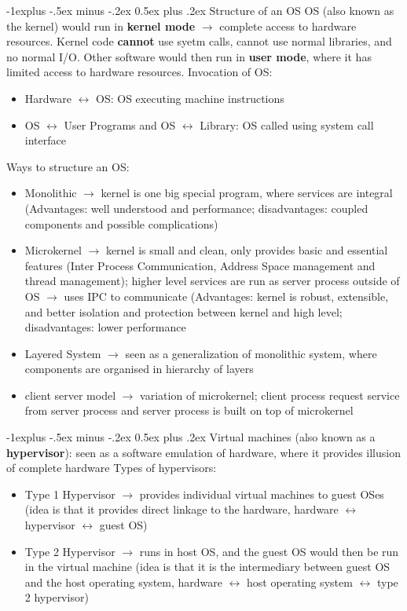\documentclass[a4paper,10pt,landscape]{article}
\makeatletter
\renewcommand{\subsection}{\@startsection{subsection}{2}{0mm}%
                                {-1explus -.5ex minus -.2ex}%
                                {0.5ex plus .2ex}%
                                {\normalfont\normalsize\bfseries}}
\makeatother
\begin{document}
\begin{multicols}{3}
\subsection{Structure of an OS}
OS (also known as the kernel) would run in \textbf{kernel mode} $\rightarrow$ complete access to hardware resources. Kernel code \textbf{cannot} use syetm calls, cannot use normal libraries, and no normal I/O. Other software would then run in \textbf{user mode}, where it has limited access to hardware resources. 
Invocation of OS: 
\begin{itemize}
    \item Hardware $\leftrightarrow$ OS: OS executing machine instructions
    \item OS $\leftrightarrow$ User Programs and OS $\leftrightarrow$ Library: OS called using system call interface
\end{itemize}
Ways to structure an OS:
\begin{itemize}
    \item Monolithic $\rightarrow$ kernel is one big special program, where services are integral (Advantages: well understood and performance; disadvantages: coupled components and possible complications)
    \item Microkernel $\rightarrow$ kernel is small and clean, only provides basic and essential features (Inter Process Communication, Address Space management and thread management); higher level services are run as server process outside of OS $\rightarrow$ uses IPC to communicate (Advantages: kernel is robust, extensible, and better isolation and protection between kernel and high level; disadvantages: lower performance
    \item Layered System $\rightarrow$ seen as a generalization of monolithic system, where components are organised in hierarchy of layers
    \item client server model $\rightarrow$ variation of microkernel; client process request service from server process and server process is built on top of microkernel
\end{itemize}

\subsection{Virtual machines} (also known as a \textbf{hypervisor}): seen as a software emulation of hardware, where it provides illusion of complete hardware
Types of hypervisors:
\begin{itemize}
    \item Type 1 Hypervisor $\rightarrow$ provides individual virtual machines to guest OSes (idea is that it provides direct linkage to the hardware, hardware $\leftrightarrow$ hypervisor $\leftrightarrow$ guest OS)
    \item Type 2 Hypervisor $\rightarrow$ runs in host OS, and the guest OS would then be run in the virtual machine (idea is that it is the intermediary between guest OS and the host operating system, hardware $\leftrightarrow$ host operating system $\leftrightarrow$ type 2 hypervisor)
\end{itemize}

\end{multicols}
\end{document}
